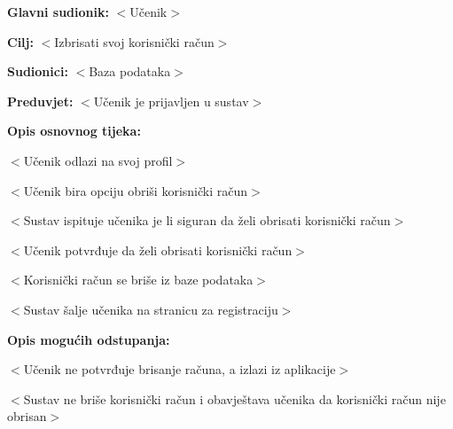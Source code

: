 					\noindent {}
					\begin{packed_item}
	
						\item \textbf{Glavni sudionik: }$<$Učenik$>$
						\item  \textbf{Cilj:} $<$Izbrisati svoj korisnički račun$>$
						\item  \textbf{Sudionici:} $<$Baza podataka$>$
						\item  \textbf{Preduvjet:} $<$Učenik je prijavljen u sustav$>$
						\item  \textbf{Opis osnovnog tijeka:}
						
						\item[] \begin{packed_enum}
	
							\item $<$Učenik odlazi na svoj profil$>$
							\item $<$Učenik bira opciju obriši korisnički račun$>$
							\item $<$Sustav ispituje učenika je li siguran da želi obrisati korisnički račun$>$
							\item $<$Učenik potvrđuje da želi obrisati korisnički račun$>$
							\item $<$Korisnički račun se briše iz baze podataka$>$
							\item $<$Sustav šalje učenika na stranicu za registraciju$>$
						\end{packed_enum}
						
						\item  \textbf{Opis mogućih odstupanja:}
						
						\item[] \begin{packed_item}
	
							\item[4.a] $<$Učenik ne potvrđuje brisanje računa, a izlazi iz aplikacije$>$
							\item[] \begin{packed_enum}
								
								\item $<$Sustav ne briše korisnički račun i obavještava učenika da korisnički račun nije obrisan$>$
								
							\end{packed_enum}
							
						\end{packed_item}
					\end{packed_item}

